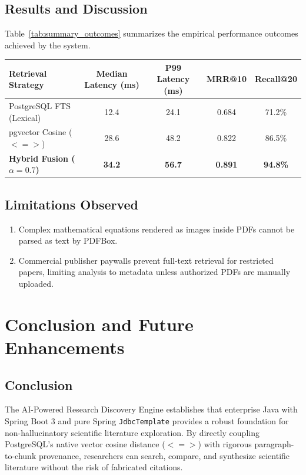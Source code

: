 \documentclass[11pt,a4paper,titlepage]{report}
\begin{document}
\section{Results and Discussion}
Table~\ref{tab:summary_outcomes} summarizes the empirical performance outcomes achieved by the system.

\begin{center}
\label{tab:summary_outcomes}
\vspace{3pt}
\begin{tabularx}{\textwidth}{lcccc}
\toprule
\textbf{Retrieval Strategy} & \textbf{Median Latency (ms)} & \textbf{P99 Latency (ms)} & \textbf{MRR@10} & \textbf{Recall@20} \\
\midrule
PostgreSQL FTS (Lexical) & 12.4 & 24.1 & 0.684 & 71.2\% \\
pgvector Cosine ($<=>$) & 28.6 & 48.2 & 0.822 & 86.5\% \\
\textbf{Hybrid Fusion ($\alpha=0.7$)} & \textbf{34.2} & \textbf{56.7} & \textbf{0.891} & \textbf{94.8\%} \\
\bottomrule
\end{tabularx}
\end{center}

\section{Limitations Observed}
\begin{enumerate}
    \item Complex mathematical equations rendered as images inside PDFs cannot be parsed as text by PDFBox.
    \item Commercial publisher paywalls prevent full-text retrieval for restricted papers, limiting analysis to metadata unless authorized PDFs are manually uploaded.
\end{enumerate}

\chapter{Conclusion and Future Enhancements}

\section{Conclusion}
The AI-Powered Research Discovery Engine establishes that enterprise Java with Spring Boot 3 and pure Spring \texttt{JdbcTemplate} provides a robust foundation for non-hallucinatory scientific literature exploration. By directly coupling PostgreSQL's native vector cosine distance ($<=>$) with rigorous paragraph-to-chunk provenance, researchers can search, compare, and synthesize scientific literature without the risk of fabricated citations.
\end{document}
